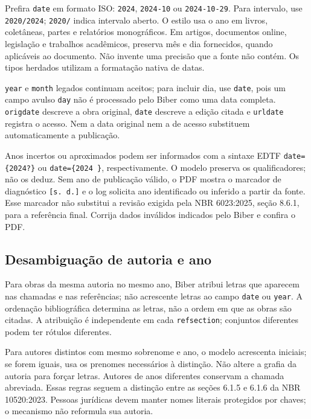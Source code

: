 Prefira \texttt{date} em formato ISO: \texttt{2024}, \texttt{2024-10} ou
\texttt{2024-10-29}. Para intervalo, use \texttt{2020/2024};
\texttt{2020/} indica intervalo aberto. O estilo usa o ano em livros,
coletâneas, partes e relatórios monográficos. Em artigos, documentos online,
legislação e trabalhos acadêmicos, preserva mês e dia fornecidos, quando
aplicáveis ao documento. Não invente uma precisão que a fonte não contém.
Os tipos herdados utilizam a formatação nativa de datas.

\texttt{year} e \texttt{month} legados continuam aceitos; para incluir dia,
use \texttt{date}, pois um campo avulso \texttt{day} não é processado pelo
Biber como uma data completa. \texttt{origdate} descreve a obra original,
\texttt{date} descreve a edição citada e \texttt{urldate} registra o acesso.
Nem a data original nem a de acesso substituem automaticamente a publicação.

Anos incertos ou aproximados podem ser informados com a sintaxe EDTF
\texttt{date=\{2024?\}} ou \texttt{date=\{2024\string~\}}, respectivamente.
O modelo preserva os qualificadores; não os deduz. Sem ano de publicação
válido, o PDF mostra o marcador de diagnóstico \texttt{[s. d.]} e o log
solicita ano identificado ou inferido a partir da fonte. Esse marcador não
substitui a revisão exigida pela NBR 6023:2025, seção 8.6.1, para a referência
final. Corrija dados inválidos indicados pelo Biber e confira o PDF.

\subsection*{Desambiguação de autoria e ano}

Para obras da mesma autoria no mesmo ano, Biber atribui letras que aparecem
nas chamadas e nas referências; não acrescente letras ao campo \texttt{date}
ou \texttt{year}. A ordenação bibliográfica determina as letras, não a ordem
em que as obras são citadas. A atribuição é independente em cada
\texttt{refsection}; conjuntos diferentes podem ter rótulos diferentes.

Para autores distintos com mesmo sobrenome e ano, o modelo acrescenta
iniciais; se forem iguais, usa os prenomes necessários à distinção. Não
altere a grafia da autoria para forçar letras. Autores de anos diferentes
conservam a chamada abreviada. Essas regras seguem a distinção entre as
seções 6.1.5 e 6.1.6 da NBR 10520:2023. Pessoas jurídicas devem manter nomes
literais protegidos por chaves; o mecanismo não reformula sua autoria.

